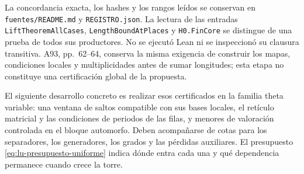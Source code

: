 La concordancia exacta, los hashes y los rangos leídos se conservan
en \texttt{fuentes/README.md} y \texttt{REGISTRO.json}. La lectura
de las entradas \texttt{LiftTheoremAllCases},
\texttt{LengthBoundAtPlaces} y \texttt{H0.FinCore} se distingue
de una prueba de todos sus productores. No se ejecutó Lean ni
se inspeccionó su clausura transitiva. A93, pp.~62--64, conserva
la misma exigencia de construir los mapas, condiciones locales
y multiplicidades antes de sumar longitudes; esta etapa no
constituye una certificación global de la propuesta.

El siguiente desarrollo concreto es realizar esos certificados
en la familia theta variable: una ventana de saltos compatible
con sus bases locales, el retículo matricial y las condiciones
de periodos de las filas, y menores de valoración controlada en
el bloque automorfo. Deben acompañarse de cotas para los
separadores, los generadores, los grados y las pérdidas auxiliares.
El presupuesto \eqref{eq:lu-presupuesto-uniforme} indica dónde
entra cada una y qué dependencia permanece cuando crece la torre.
